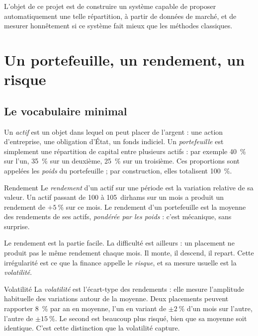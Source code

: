 L'objet de ce projet est de construire un système capable de proposer
automatiquement une telle répartition, à partir de données de marché, et de
mesurer honnêtement si ce système fait mieux que les méthodes classiques.

\section{Un portefeuille, un rendement, un risque}

\subsection{Le vocabulaire minimal}

Un \emph{actif} est un objet dans lequel on peut placer de l'argent : une action
d'entreprise, une obligation d'État, un fonds indiciel. Un \emph{portefeuille}
est simplement une répartition de capital entre plusieurs actifs : par exemple
40~\% sur l'un, 35~\% sur un deuxième, 25~\% sur un troisième. Ces proportions
sont appelées les \emph{poids} du portefeuille ; par construction, elles
totalisent 100~\%.

\begin{definitionbox}{Rendement}
Le \emph{rendement} d'un actif sur une période est la variation relative de sa
valeur. Un actif passant de 100 à 105~dirhams sur un mois a produit un rendement
de $+5~\%$ sur ce mois. Le rendement d'un portefeuille est la moyenne des
rendements de ses actifs, \emph{pondérée par les poids} : c'est mécanique, sans
surprise.
\end{definitionbox}

Le rendement est la partie facile. La difficulté est ailleurs : un placement ne
produit pas le même rendement chaque mois. Il monte, il descend, il repart. Cette
irrégularité est ce que la finance appelle le \emph{risque}, et sa mesure usuelle
est la \emph{volatilité}.

\begin{definitionbox}{Volatilité}
La \emph{volatilité} est l'écart-type des rendements : elle mesure l'amplitude
habituelle des variations autour de la moyenne. Deux placements peuvent rapporter
8~\% par an en moyenne, l'un en variant de $\pm 2~\%$ d'un mois sur l'autre,
l'autre de $\pm 15~\%$. Le second est beaucoup plus risqué, bien que sa moyenne
soit identique. C'est cette distinction que la volatilité capture.
\end{definitionbox}


